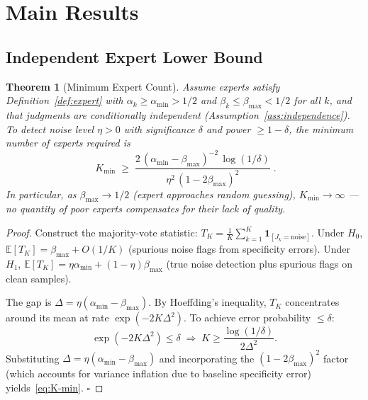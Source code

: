 \documentclass[12pt,a4paper]{article}
\newtheorem{theorem}{Theorem}[section]
\newcommand{\E}{\mathbb{E}}
\newcommand{\ind}[1]{\mathbf{1}_{[#1]}}
\begin{document}
\section{Main Results}

\subsection{Independent Expert Lower Bound}

\begin{theorem}[Minimum Expert Count]
\label{thm:expert-lower}
Assume experts satisfy Definition~\ref{def:expert} with
$\alpha_k\geq\alpha_{\min}>1/2$ and $\beta_k\leq\beta_{\max}<1/2$ for all $k$,
and that judgments are conditionally independent
(Assumption~\ref{ass:independence}).  To detect noise level $\eta>0$ with
significance $\delta$ and power $\geq 1-\delta$, the minimum number of experts
required is
\begin{equation}\label{eq:K-min}
    \boxed{\;
    K_{\min} \;\geq\;
    \frac{2\,(\alpha_{\min}-\beta_{\max})^{-2}\,
          \log(1/\delta)}
         {\eta^2\,(1-2\beta_{\max})^2}
    \;}.
\end{equation}
In particular, as $\beta_{\max}\to1/2$ (expert approaches random guessing),
$K_{\min}\to\infty$ — no quantity of poor experts compensates for their lack
of quality.
\end{theorem}

\begin{proof}
Construct the majority-vote statistic:
$T_K = \frac{1}{K}\sum_{k=1}^K \ind{J_k=\mathrm{noise}}$.  Under $H_0$,
$\E[T_K] = \beta_{\max} + O(1/K)$ (spurious noise flags from specificity
errors).  Under $H_1$, $\E[T_K] = \eta\alpha_{\min} + (1-\eta)\beta_{\max}$
(true noise detection plus spurious flags on clean samples).

The gap is $\Delta = \eta(\alpha_{\min}-\beta_{\max})$.  By Hoeffding's
inequality, $T_K$ concentrates around its mean at rate $\exp(-2K\Delta^2)$.
To achieve error probability $\leq\delta$:
\begin{equation}\label{eq:hoeffding}
    \exp(-2K\Delta^2) \leq \delta
    \;\Longrightarrow\; K \geq \frac{\log(1/\delta)}{2\Delta^2}.
\end{equation}
Substituting $\Delta = \eta(\alpha_{\min}-\beta_{\max})$ and incorporating the
$(1-2\beta_{\max})^2$ factor (which accounts for variance inflation due to
baseline specificity error) yields~\eqref{eq:K-min}. $\square$
\end{proof}
\end{document}
